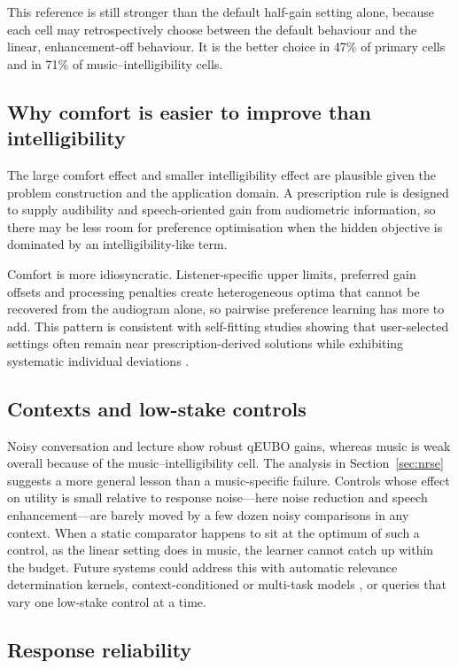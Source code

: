 \documentclass[preprint,12pt]{elsarticle}
\begin{document}
This reference is still stronger than the default half-gain setting alone, because each cell may retrospectively choose between the default behaviour and the linear, enhancement-off behaviour. It is the better choice in 47\% of primary cells and in 71\% of music--intelligibility cells.

\subsection{Why comfort is easier to improve than intelligibility}

The large comfort effect and smaller intelligibility effect are plausible given the problem construction and the application domain. A prescription rule is designed to supply audibility and speech-oriented gain from audiometric information, so there may be less room for preference optimisation when the hidden objective is dominated by an intelligibility-like term.

Comfort is more idiosyncratic. Listener-specific upper limits, preferred gain offsets and processing penalties create heterogeneous optima that cannot be recovered from the audiogram alone, so pairwise preference learning has more to add. This pattern is consistent with self-fitting studies showing that user-selected settings often remain near prescription-derived solutions while exhibiting systematic individual deviations \cite{dreschler2008,sabin2020}.

\subsection{Contexts and low-stake controls}

Noisy conversation and lecture show robust qEUBO gains, whereas music is weak overall because of the music--intelligibility cell. The analysis in Section~\ref{sec:nrse} suggests a more general lesson than a music-specific failure. Controls whose effect on utility is small relative to response noise---here noise reduction and speech enhancement---are barely moved by a few dozen noisy comparisons in any context. When a static comparator happens to sit at the optimum of such a control, as the linear setting does in music, the learner cannot catch up within the budget. Future systems could address this with automatic relevance determination kernels, context-conditioned or multi-task models \cite{birlutiu2010}, or queries that vary one low-stake control at a time.

\subsection{Response reliability}
\end{document}
